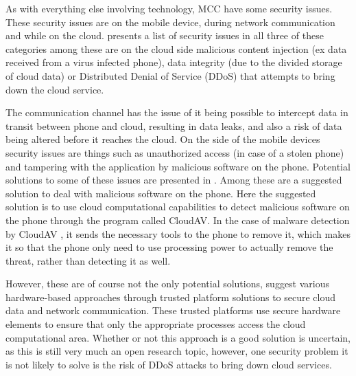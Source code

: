 As with everything else involving technology, MCC have some security issues.
These security issues are on the mobile device, during network communication and while on the cloud.
\citet{6923101} presents a list of security issues in all three of these categories among these are on the cloud side malicious content injection (ex data received from a virus infected phone), data integrity (due to the divided storage of cloud data) or Distributed Denial of Service (DDoS) that attempts to bring down the cloud service.

The communication channel has the issue of it being possible to intercept data in transit between phone and cloud, resulting in data leaks, and also a risk of data being altered before it reaches the cloud.
On the side of the mobile devices security issues are things such as unauthorized access (in case of a stolen phone) and tampering with the application by malicious software on the phone.
Potential solutions to some of these issues are presented in \citet{6583635}.
Among these are a suggested solution to deal with malicious software on the phone.
Here the suggested solution is to use cloud computational capabilities to detect malicious software on the phone through the program called CloudAV.
In the case of malware detection by CloudAV \citep{Oberheide:2008:CNA:1496711.1496718}, it sends the necessary tools to the phone to remove it, which makes it so that the phone only need to use processing power to actually remove the threat, rather than detecting it as well.

However, these are of course not the only potential solutions, \citet{7056876} suggest various hardware-based approaches through trusted platform solutions to secure cloud data and network communication.
These trusted platforms use secure hardware elements to ensure that only the appropriate processes access the cloud computational area.
Whether or not this approach is a good solution is uncertain, as this is still very much an open research topic, however, one security problem it is not likely to solve is the risk of DDoS attacks to bring down cloud services.

